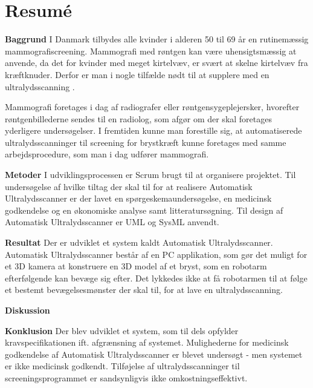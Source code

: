 \chapter{Resumé}
\textbf{Baggrund} \newline
I Danmark tilbydes alle kvinder i alderen 50 til 69 år en rutinemæssig mammografiscreening. Mammografi med røntgen kan være uhensigtsmæssig at anvende, da det for kvinder med meget kirtelvæv, er svært at skelne kirtelvæv fra kræftknuder. Derfor er man i nogle tilfælde nødt til at supplere med en ultralydsscanning \cite{Ultralyd}.

Mammografi foretages i dag af radiografer eller røntgensygeplejersker, hvorefter røntgenbillederne sendes til en radiolog, som afgør om der skal foretages yderligere undersøgelser. I fremtiden kunne man forestille sig, at automatiserede ultralydsscanninger til screening for brystkræft kunne foretages med samme arbejdsprocedure, som man i dag udfører mammografi.

\textbf{Metoder} \newline
I udviklingsprocessen er Scrum brugt til at organisere projektet. Til undersøgelse af hvilke tiltag der skal til for at realisere Automatisk Ultralydsscanner er der lavet en spørgeskemaundersøgelse, en medicinsk godkendelse og en økonomiske analyse samt litteratursøgning. Til design af Automatisk Ultralydsscanner er UML og SysML anvendt. 

\textbf{Resultat} \newline
Der er udviklet et system kaldt Automatisk Ultralydsscanner. Automatisk Ultralydsscanner består af en PC applikation, som gør det muligt for et 3D kamera at konstruere en 3D model af et bryst, som en robotarm efterfølgende kan bevæge sig efter. Det lykkedes ikke at få robotarmen til at følge et bestemt bevægelsesmønster der skal til, for at lave en ultralydsscanning. 

\textbf{Diskussion} \newline


\textbf{Konklusion} \newline
Der blev udviklet et system, som til dels opfylder kravspecifikationen ift. afgrænsning af systemet. Mulighederne for medicinsk godkendelse af Automatisk Ultralydsscanner er blevet undersøgt - men systemet er ikke medicinsk godkendt. Tilføjelse af ultralydsscanninger til screeningsprogrammet er sandsynligvis ikke omkostningseffektivt.
